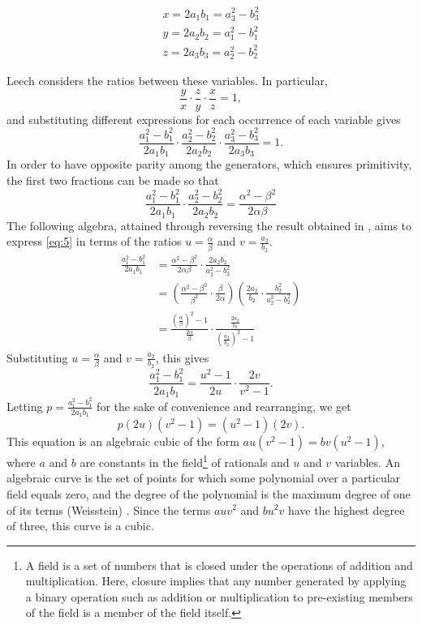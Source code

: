 \documentclass[11pt]{article}
\begin{document}
\begin{equation}
\begin{aligned}
x=2a_1b_1=a_3^2-b_3^2 \\
y=2a_2b_2=a_1^2-b_1^2 \\
z=2a_3b_3=a_2^2-b_2^2
\end{aligned}
\label{eq:4}
\end{equation}

Leech considers the ratios between these variables. In particular,
$$\frac{y}{x}\cdot\frac{z}{y}\cdot\frac{x}{z}=1,$$
and substituting different expressions for each occurrence of each variable gives
$$\frac{a_1^2-b_1^2}{2a_1b_1}\cdot\frac{a_2^2-b_2^2}{2a_2b_2}\cdot\frac{a_3^2-b_3^2}{2a_3b_3}=1.$$
In order to have opposite parity among the generators, which ensures primitivity, the first two fractions can be made so that
\begin{equation}
\frac{a_1^2-b_1^2}{2a_1b_1}\cdot\frac{a_2^2-b_2^2}{2a_2b_2}=\frac{\alpha^2-\beta^2}{2\alpha\beta}
\label{eq:5}
\end{equation}
The following algebra, attained through reversing the result obtained in \cite{leech}, aims to express \eqref{eq:5} in terms of the ratios $u=\frac{\alpha}{\beta}$ and $v=\frac{a_2}{b_2}$.
\begin{equation*}
\begin{aligned}
\frac{a_1^2-b_1^2}{2a_1b_1}&=\frac{\alpha^2-\beta^2}{2\alpha\beta}\cdot\frac{2a_2b_2}{a_2^2-b_2^2} \\
&=\left(\frac{\alpha^2-\beta^2}{\beta^2}\cdot\frac{\beta}{2\alpha}\right)\left(\frac{2a_2}{b_2}\cdot\frac{b_2^2}{a_2^2-b_2^2}\right) \\
&=\frac{\left(\frac{\alpha}{\beta}\right)^2-1}{\frac{2\alpha}{\beta}}\cdot{\frac{\frac{2a_2}{b_2}}{\left(\frac{a_2}{b_2}\right)^2-1}}
\end{aligned}
\end{equation*}
Substituting $u=\frac{\alpha}{\beta}$ and $v=\frac{a_2}{b_2}$, this gives
$$\frac{a_1^2-b_1^2}{2a_1b_1}=\frac{u^2-1}{2u}\cdot\frac{2v}{v^2-1}.$$
Letting $p=\frac{a_1^2-b_1^2}{2a_1b_1}$ for the sake of convenience and rearranging, we get
\begin{equation}
p(2u)(v^2-1)=(u^2-1)(2v).
\end{equation}
This equation is an algebraic cubic of the form $au(v^2-1)=bv(u^2-1)$, where $a$ and $b$ are constants in the field\footnote{A field is a set of numbers that is closed under the operations of addition and multiplication. Here, closure implies that any number generated by applying a binary operation such as addition or multiplication to pre-existing members of the field is a member of the field itself.} of rationals and $u$ and $v$ variables. An algebraic curve is the set of points for which some polynomial over a particular field equals zero, and the degree of the polynomial is the maximum degree of one of its terms (Weisstein) \cite{alcurve}. Since the terms $auv^2$ and $bu^2v$ have the highest degree of three, this curve is a cubic.
\end{document}
